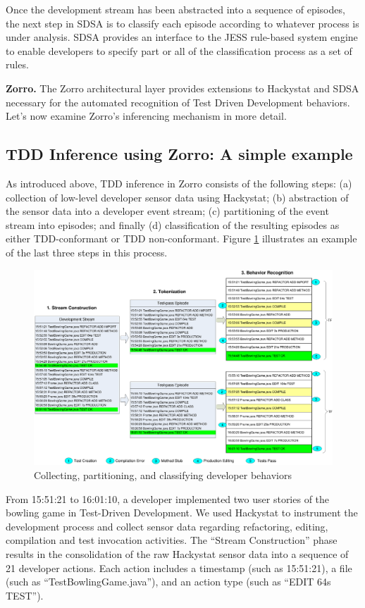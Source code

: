\documentclass[smallextended]{svjour3}     %
\begin{document}
Once the development stream has been abstracted into a sequence of
episodes, the next step in SDSA is to classify each episode according to
whatever process is under analysis.  SDSA provides an interface to the JESS
rule-based system engine to enable developers to specify part or all of the
classification process as a set of rules.


{\bf Zorro.} The Zorro architectural layer provides extensions to Hackystat and SDSA
necessary for the automated recognition of Test Driven Development
behaviors.  Let's now examine Zorro's inferencing mechanism in more detail. 

\subsection{TDD Inference using Zorro: A simple example}

As introduced above, TDD inference in Zorro consists of the following
steps: (a) collection of low-level developer sensor data using Hackystat;
(b) abstraction of the sensor data into a developer event stream; (c)
partitioning of the event stream into episodes; and finally
(d) classification of the resulting episodes as either TDD-conformant or TDD
non-conformant.  Figure \ref{fig:SDSA-Example} illustrates an example of
the last three steps in this process.

\begin{figure}[htbp]
  \centering
  \includegraphics[width=1.0\textwidth]{Visio-SDSA-Example}
  \caption{Collecting, partitioning, and classifying developer behaviors}
  \label{fig:SDSA-Example}
\end{figure}

From 15:51:21 to 16:01:10, a developer implemented two user stories of the
bowling game in Test-Driven Development. We used Hackystat to instrument
the development process and collect sensor data regarding 
refactoring, editing, compilation and test invocation activities.  The ``Stream
Construction'' phase results in the consolidation of the raw Hackystat
sensor data into a sequence of 21 developer actions. Each action includes a
timestamp (such as 15:51:21), a file (such as ``TestBowlingGame.java''),
and an action type (such as ``EDIT 64s TEST'').
\end{document}
